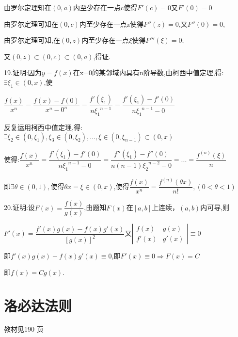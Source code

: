 由罗尔定理知在$(0,a)$内至少存在一点c使得$F'(c) = 0$又$F'(0) = 0$

由罗尔定理可知在$(0,c)$内至少存在一点z使得$F''(z) = 0$,又$F''(0) = 0$,

由罗尔定理可知,在$(0,z)$内至少存在一点$\xi $使得$F'''(\xi ) = 0$;

又$\left( {0,z} \right) \subset \left( {0,c} \right) \subset \left( {0,a} \right)$,得证.

19.证明:因为$y=f(x)$在x=0的某邻域内具有n阶导数,由柯西中值定理,得:$\exists {\xi _1} \in \left( {0,x} \right)$,使

$\dfrac{{f(x)}}{{{x^n}}} = \dfrac{{f(x) - f(0)}}{{{x^n} - {0^n}}} = \dfrac{{f'({\xi _1})}}{{n{\xi _1}^{n - 1}}} = \dfrac{{f'({\xi _1}) - f'(0)}}{{n{\xi _1}^{n - 1} - 0}}$

反复运用柯西中值定理,得:$\exists {\xi _2} \in (0,{\xi _1}),{\xi _3} \in (0,{\xi _2}), \ldots ,\xi  \in (0,{\xi _{n - 1}}) \subset (0,x)$

使得:$\dfrac{{f(x)}}{{{x^n}}} = \dfrac{{f'\left( {{\xi _1}} \right) - f'\left( 0 \right)}}{{n{\xi _1}^{n - 1} - 0}} = \dfrac{{f''\left( {{\xi _1}} \right) - f''\left( 0 \right)}}{{n\left( {n - 1} \right){\xi _2}^{n - 2} - 0}} = ... = \dfrac{{{f^{\left( n \right)}}\left( \xi  \right)}}{{n}}$

即$\exists \theta  \in (0,1),$使得$\theta x = \xi  \in (0,x)$,使得$\dfrac{{f(x)}}{{{x^n}}} = \dfrac{{{f^{(n)}}(\theta x)}}{{n!}},(0 < \theta  < 1)$

20.证明:设$F(x) = \dfrac{{f(x)}}{{g(x)}}$,由题知$F(x)$在$[a,b]$上连续，$(a,b)$内可导,则

$F'(x) = \dfrac{{f'(x)g(x) - f(x)g'(x)}}{{{{[g(x)]}^2}}}$又$\left| {\begin{array}{*{20}{c}}
{f(x)}&{g(x)}\\
{f'(x)}&{g'(x)}
\end{array}} \right| \equiv 0$

即$f'(x)g(x) - f(x)g'(x) \equiv 0$,即$F'(x) \equiv 0 \Rightarrow F(x) = C$

即$f(x) = Cg(x)$.




\section{洛必达法则}
\begin{flushright}
  \color{zhanqing!80}
  \color{zhanqing!80}
   教材见190 页 %
\end{flushright}

